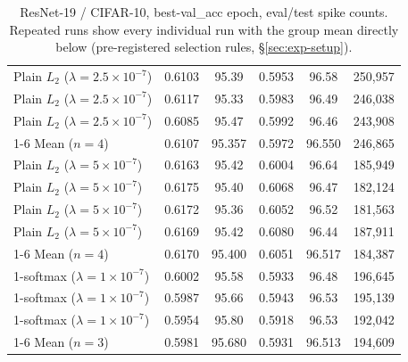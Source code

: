 \begin{table}
\begin{tabular}{lccccc}
Plain $L_2$ ($\lambda=2.5\times10^{-7}$) & 0.6103 & 95.39 & 0.5953 & 96.58 & 250,957 \\
Plain $L_2$ ($\lambda=2.5\times10^{-7}$) & 0.6117 & 95.33 & 0.5983 & 96.49 & 246,038 \\
Plain $L_2$ ($\lambda=2.5\times10^{-7}$) & 0.6085 & 95.47 & 0.5992 & 96.46 & 243,908 \\
\cmidrule{1-6}
Mean ($n=4$) & 0.6107 & 95.357 & 0.5972 & 96.550 & 246,865 \\
\midrule
Plain $L_2$ ($\lambda=5\times10^{-7}$) & 0.6163 & 95.42 & 0.6004 & 96.64 & 185,949 \\
Plain $L_2$ ($\lambda=5\times10^{-7}$) & 0.6175 & 95.40 & 0.6068 & 96.47 & 182,124 \\
Plain $L_2$ ($\lambda=5\times10^{-7}$) & 0.6172 & 95.36 & 0.6052 & 96.52 & 181,563 \\
Plain $L_2$ ($\lambda=5\times10^{-7}$) & 0.6169 & 95.42 & 0.6080 & 96.44 & 187,911 \\
\cmidrule{1-6}
Mean ($n=4$) & 0.6170 & 95.400 & 0.6051 & 96.517 & 184,387 \\
\midrule
1-softmax ($\lambda=1\times10^{-7}$) & 0.6002 & 95.58 & 0.5933 & 96.48 & 196,645 \\
1-softmax ($\lambda=1\times10^{-7}$) & 0.5987 & 95.66 & 0.5943 & 96.53 & 195,139 \\
1-softmax ($\lambda=1\times10^{-7}$) & 0.5954 & 95.80 & 0.5918 & 96.53 & 192,042 \\
\cmidrule{1-6}
Mean ($n=3$) & 0.5981 & 95.680 & 0.5931 & 96.513 & 194,609 \\
\bottomrule
\end{tabular}
\caption{ResNet-19 / CIFAR-10, best-val\_acc epoch, eval/test spike counts. Repeated runs show every individual run with the group mean directly below (pre-registered selection rules, \S\ref{sec:exp-setup}).}
\label{tab:t1_main}
\end{table}
